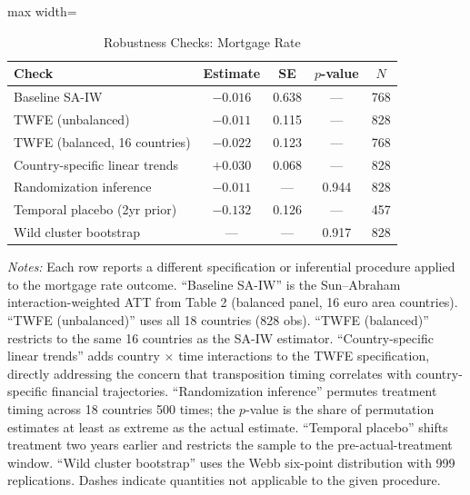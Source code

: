 \begin{table}[!h]
\centering
\caption{Robustness Checks: Mortgage Rate}
\label{tab:robustness}
\begin{adjustbox}{max width=\textwidth}
\begin{tabular}[t]{lcccc}
\toprule
Check & Estimate & SE & $p$-value & $N$\\
\midrule
Baseline SA-IW & $-0.016$ & 0.638 & --- & 768\\
TWFE (unbalanced) & $-0.011$ & 0.115 & --- & 828\\
TWFE (balanced, 16 countries) & $-0.022$ & 0.123 & --- & 768\\
Country-specific linear trends & $+0.030$ & 0.068 & --- & 828\\
Randomization inference & $-0.011$ & --- & 0.944 & 828\\
Temporal placebo (2yr prior) & $-0.132$ & 0.126 & --- & 457\\
Wild cluster bootstrap & --- & --- & 0.917 & 828\\
\bottomrule
\end{tabular}
\end{adjustbox}
\par\vspace{0.3em}
{\footnotesize \textit{Notes:} Each row reports a different specification or inferential procedure applied to the mortgage rate outcome. ``Baseline SA-IW'' is the Sun--Abraham interaction-weighted ATT from Table 2 (balanced panel, 16 euro area countries). ``TWFE (unbalanced)'' uses all 18 countries (828 obs). ``TWFE (balanced)'' restricts to the same 16 countries as the SA-IW estimator. ``Country-specific linear trends'' adds country $\times$ time interactions to the TWFE specification, directly addressing the concern that transposition timing correlates with country-specific financial trajectories. ``Randomization inference'' permutes treatment timing across 18 countries 500 times; the $p$-value is the share of permutation estimates at least as extreme as the actual estimate. ``Temporal placebo'' shifts treatment two years earlier and restricts the sample to the pre-actual-treatment window. ``Wild cluster bootstrap'' uses the Webb six-point distribution with 999 replications. Dashes indicate quantities not applicable to the given procedure.}
\end{table}
